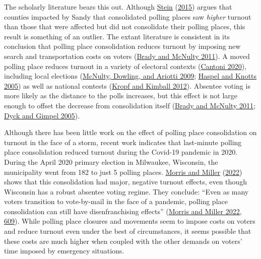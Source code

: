 \documentclass[
  12pt,
]{article}
\begin{document}
The scholarly literature bears this out. Although \protect\hyperlink{ref-Stein2015}{Stein} (\protect\hyperlink{ref-Stein2015}{2015}) argues that counties impacted by Sandy that consolidated polling places saw \emph{higher} turnout than those that were affected but did not consolidate their polling places, this result is something of an outlier. The extant literature is consistent in its conclusion that polling place consolidation reduces turnout by imposing new search and transportation costs on voters (\protect\hyperlink{ref-Brady2011}{Brady and McNulty 2011}). A moved polling place reduces turnout in a variety of electoral contexts (\protect\hyperlink{ref-Cantoni2020}{Cantoni 2020}), including local elections (\protect\hyperlink{ref-McNulty2009}{McNulty, Dowling, and Ariotti 2009}; \protect\hyperlink{ref-Haspel2005}{Haspel and Knotts 2005}) as well as national contests (\protect\hyperlink{ref-Kropf2012}{Kropf and Kimball 2012}). Absentee voting is more likely as the distance to the polls increases, but this effect is not large enough to offset the decrease from consolidation itself (\protect\hyperlink{ref-Brady2011}{Brady and McNulty 2011}; \protect\hyperlink{ref-Dyck2005}{Dyck and Gimpel 2005}).

Although there has been little work on the effect of polling place consolidation on turnout in the face of a storm, recent work indicates that last-minute polling place consolidation reduced turnout during the Covid-19 pandemic in 2020. During the April 2020 primary election in Milwaukee, Wisconsin, the municipality went from 182 to just 5 polling places. \protect\hyperlink{ref-Morris2022}{Morris and Miller} (\protect\hyperlink{ref-Morris2022}{2022}) shows that this consolidation had major, negative turnout effects, even though Wisconsin has a robust absentee voting regime. They conclude: ``Even as many voters transition to vote-by-mail in the face of a pandemic, polling place consolidation can still have disenfranchising effects'' (\protect\hyperlink{ref-Morris2022}{Morris and Miller 2022, 609}). While polling place closures and movements seem to impose costs on voters and reduce turnout even under the best of circumstances, it seems possible that these costs are much higher when coupled with the other demands on voters' time imposed by emergency situations.
\end{document}
